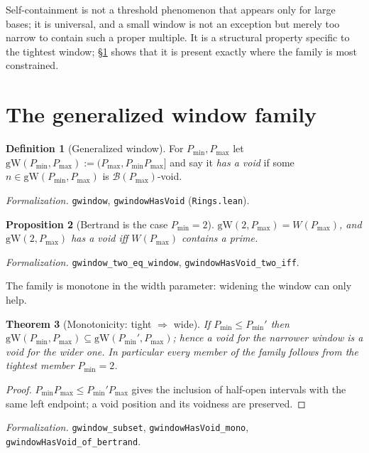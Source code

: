 \documentclass[11pt,a4paper]{amsart}
\theoremstyle{plain}
\newtheorem{theorem}{Theorem}[section]
\newtheorem{proposition}[theorem]{Proposition}
\theoremstyle{definition}
\newtheorem{definition}[theorem]{Definition}
\theoremstyle{plain}
\theoremstyle{remark}
\newcommand{\lean}[1]{\textup{\texttt{#1}}}
\newcommand{\Formal}[1]{\par\smallskip\noindent\emph{Formalization.} #1\par\smallskip}
\begin{document}
Self-containment is not a threshold phenomenon that appears only for large bases; it is
universal, and a small window is not an exception but merely too narrow to contain such a
proper multiple. It is a structural property specific to the tightest window; \S\ref{sec:family}
shows that it is present exactly where the family is most constrained.

\section{The generalized window family}
\label{sec:family}

\begin{definition}[Generalized window]
For $P_{\min},P_{\max}$ let $\mathrm{gW}(P_{\min},P_{\max}):=(P_{\max},P_{\min}P_{\max}]$
and say it \emph{has a void} if some $n\in\mathrm{gW}(P_{\min},P_{\max})$ is
$\mathcal{B}(P_{\max})$-void.
\end{definition}

\Formal{\lean{gwindow}, \lean{gwindowHasVoid} (\lean{Rings.lean}).}

\begin{proposition}[Bertrand is the case $P_{\min}=2$]\label{prop:two}
$\mathrm{gW}(2,P_{\max})=W(P_{\max})$, and $\mathrm{gW}(2,P_{\max})$ has a void iff
$W(P_{\max})$ contains a prime.
\end{proposition}

\Formal{\lean{gwindow\_two\_eq\_window}, \lean{gwindowHasVoid\_two\_iff}.}

The family is monotone in the width parameter: widening the window can only help.

\begin{theorem}[Monotonicity: tight $\Rightarrow$ wide]\label{thm:mono}
If $P_{\min}\le P_{\min}'$ then $\mathrm{gW}(P_{\min},P_{\max})\subseteq
\mathrm{gW}(P_{\min}',P_{\max})$; hence a void for the narrower window is a void for the
wider one. In particular every member of the family follows from the tightest member
$P_{\min}=2$.
\end{theorem}

\begin{proof}
$P_{\min}P_{\max}\le P_{\min}'P_{\max}$ gives the inclusion of half-open intervals with the
same left endpoint; a void position and its voidness are preserved.
\end{proof}

\Formal{\lean{gwindow\_subset}, \lean{gwindowHasVoid\_mono},
\lean{gwindowHasVoid\_of\_bertrand}.}
\end{document}
